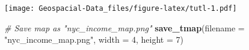 \documentclass[]{article}
\newenvironment{Shaded}{\begin{snugshade}}{\end{snugshade}}
\newcommand{\CommentTok}[1]{\textcolor[rgb]{0.56,0.35,0.01}{\textit{#1}}}
\newcommand{\DataTypeTok}[1]{\textcolor[rgb]{0.13,0.29,0.53}{#1}}
\newcommand{\DecValTok}[1]{\textcolor[rgb]{0.00,0.00,0.81}{#1}}
\newcommand{\KeywordTok}[1]{\textcolor[rgb]{0.13,0.29,0.53}{\textbf{#1}}}
\newcommand{\NormalTok}[1]{#1}
\newcommand{\StringTok}[1]{\textcolor[rgb]{0.31,0.60,0.02}{#1}}
\begin{document}
\texttt{[image: Geospacial-Data\_files/figure-latex/tutl-1.pdf]}

\begin{Shaded}
\begin{Highlighting}[]
\CommentTok{# Save map as "nyc_income_map.png"}
\KeywordTok{save_tmap}\NormalTok{(}\DataTypeTok{filename =} \StringTok{"nyc_income_map.png"}\NormalTok{, }\DataTypeTok{width =} \DecValTok{4}\NormalTok{, }\DataTypeTok{height =} \DecValTok{7}\NormalTok{)}
\end{Highlighting}
\end{Shaded}
\end{document}
